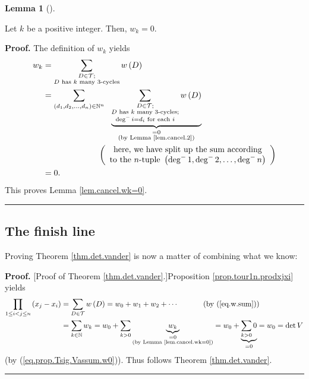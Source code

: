 \documentclass[numbers=enddot,12pt,final,onecolumn,notitlepage]{scrartcl}%
\numberwithin{exer}{subsection}
\theoremstyle{definition}
\newtheorem{lem}[theo]{Lemma}
\newenvironment{lemma}[1][]
{\begin{lem}[#1]\begin{leftbar}}
{\end{leftbar}\end{lem}}
\newenvironment{proof}[1][Proof]{\noindent\textbf{#1.} }{\ \rule{0.5em}{0.5em}}
\let\sumnonlimits\sum
\let\prodnonlimits\prod
\renewcommand{\sum}{\sumnonlimits\limits}
\renewcommand{\prod}{\prodnonlimits\limits}
\begin{document}
\begin{lemma}
\label{lem.cancel.wk=0}Let $k$ be a positive integer. Then, $w_{k}=0$.
\end{lemma}

\begin{proof}
The definition of $w_{k}$ yields%
\begin{align*}
w_{k}  &  =\sum_{\substack{D\in\mathcal{T};\\D\text{ has }k\text{ many
}3\text{-cycles}}}w\left(  D\right) \\
&  =\sum_{\left(  d_{1},d_{2},\ldots,d_{n}\right)  \in\mathbb{N}^{n}%
}\ \ \underbrace{\sum_{\substack{D\in\mathcal{T};\\D\text{ has }k\text{ many
}3\text{-cycles};\\\deg^{-}i=d_{i}\text{ for each }i}}w\left(  D\right)
}_{\substack{=0\\\text{(by Lemma \ref{lem.cancel.2})}}}\\
&  \ \ \ \ \ \ \ \ \ \ \ \ \ \ \ \ \ \ \ \ \left(
\begin{array}
[c]{c}%
\text{here, we have split up the sum according}\\
\text{to the }n\text{-tuple }\left(  \deg^{-}1,\deg^{-}2,\ldots,\deg
^{-}n\right)
\end{array}
\right) \\
&  =0.
\end{align*}
This proves Lemma \ref{lem.cancel.wk=0}.
\end{proof}

\subsection{The finish line}

Proving Theorem \ref{thm.det.vander} is now a matter of combining what we know:

\begin{proof}
[Proof of Theorem \ref{thm.det.vander}.]Proposition \ref{prop.tour1n.prodxjxi}
yields%
\begin{align*}
\prod_{1\leq i<j\leq n}\left(  x_{j}-x_{i}\right)   &  =\sum_{D\in\mathcal{T}%
}w\left(  D\right)  =w_{0}+w_{1}+w_{2}+\cdots\ \ \ \ \ \ \ \ \ \ \left(
\text{by (\ref{eq.w.sum})}\right) \\
&  =\sum_{k\in\mathbb{N}}w_{k}=w_{0}+\sum_{k>0}\underbrace{w_{k}%
}_{\substack{=0\\\text{(by Lemma \ref{lem.cancel.wk=0})}}}=w_{0}%
+\underbrace{\sum_{k>0}0}_{=0}=w_{0}=\det V
\end{align*}
(by (\ref{eq.prop.Tsig.Vassum.w0})). Thus follows Theorem \ref{thm.det.vander}.
\end{proof}
\end{document}

